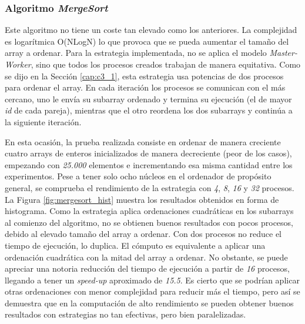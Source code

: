 \subsubsection{Algoritmo \textit{MergeSort}}

Este algoritmo no tiene un coste tan elevado como los anteriores. La complejidad es logarítmica O(NLogN) lo que provoca que se pueda aumentar el tamaño del array a ordenar. Para la estrategia implementada, no se aplica el modelo \textit{Master-Worker}, sino que todos los procesos creados trabajan de manera equitativa. Como se dijo en la Sección \ref{cap:c3_1}, esta estrategia usa potencias de dos procesos para ordenar el array. En cada iteración los procesos se comunican con el más cercano, uno le envía su subarray ordenado y termina su ejecución (el de mayor \textit{id} de cada pareja), mientras que el otro reordena los dos subarrays y continúa a la siguiente iteración.


En esta ocasión, la prueba realizada consiste en ordenar de manera creciente cuatro arrays de enteros inicializados de manera decreciente (peor de los casos), empezando con \textit{25.000} elementos e incrementando esa misma cantidad entre los experimentos. Pese a tener solo ocho núcleos en el ordenador de propósito general, se comprueba el rendimiento de la estrategia con \textit{4}, \textit{8}, \textit{16} y \textit{32} procesos. La Figura \ref{fig:mergesort_hist} muestra los resultados obtenidos en forma de histograma. Como la estrategia aplica ordenaciones cuadráticas en los subarrays al comienzo del algoritmo, no se obtienen buenos resultados con pocos procesos, debido al elevado tamaño del array a ordenar. Con dos procesos no reduce el tiempo de ejecución, lo duplica. El cómputo es equivalente a aplicar una ordenación cuadrática con la mitad del array a ordenar. No obstante, se puede apreciar una notoria reducción del tiempo de ejecución a partir de \textit{16} procesos, llegando a tener un \textit{speed-up} aproximado de \textit{15.5}. Es cierto que se podrían aplicar otras ordenaciones con menor complejidad para reducir más el tiempo, pero así se demuestra que en la computación de alto rendimiento se pueden obtener buenos resultados con estrategias no tan efectivas, pero bien paralelizadas.

